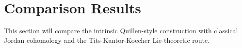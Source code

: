 \section{Comparison Results}

This section will compare the intrinsic Quillen-style construction with
classical Jordan cohomology and the Tits-Kantor-Koecher Lie-theoretic route.
